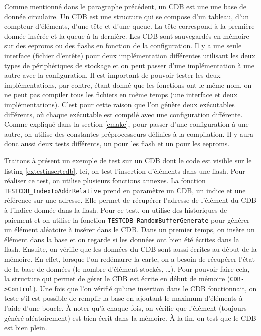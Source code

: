 \documentclass[a4paper]{article}
\begin{document}
Comme mentionné dans le paragraphe précédent, un CDB est une une base de donnée
circulaire. Un CDB est une structure qui se compose d'un tableau, d'un compteur
d'éléments, d'une tête et d'une queue. La tête correspond à la première donnée
insérée et la queue à la dernière. Les CDB sont sauvegardés en mémoire sur des
eeproms ou des flashs en fonction de la configuration. Il y a une seule
interface (fichier d'entête) pour deux implémentation différentes utilisant les
deux types de périphériques de stockage et on peut passer d'une implémentation à
une autre avec la configuration. Il est important de pouvoir tester les deux
implémentations, par contre, étant donné que les fonctions ont le même nom, on
ne peut pas compiler tous les fichiers en même temps (une interface et deux
implémentations). C'est pour cette raison que l'on génère deux exécutables
différents, où chaque exécutable est compilé avec une configuration différente.
Comme expliqué dans la section \ref{cmake}, pour passer d'une configuration à
une autre, on utilise des constantes préprocesseurs définies à la compilation.
Il y aura donc aussi deux tests différents, un pour les flash et un pour les
eeproms.

Traitons à présent un exemple de test sur un CDB dont le code est visible sur le
listing \ref{extestinsertcdb}. Ici, on test l'insertion d'éléments dans une
flash. Pour réaliser ce test, on utilise plusieurs fonctions annexes. La
fonction \verb|TESTCDB_IndexToAddrRelative| prend en paramètre un CDB, un indice
et une référence sur une adresse. Elle permet de récupérer l'adresse de
l'élément du CDB à l'indice donnée dans la flash. Pour ce test, on utilise des
historiques de paiement et on utilise la fonction
\verb|TESTCDB_RandomBufferGenerate| pour générer un élément aléatoire à insérer
dans le CDB. Dans un premier temps, on insère un élément dans la base et on
regarde si les données ont bien été écrites dans la flash. Ensuite, on vérifie
que les données du CDB sont aussi écrites au début de la mémoire. En effet,
lorsque l'on redémarre la carte, on a besoin de récupérer l'état de la base de
données (le nombre d'élément stockés, \dots). Pour pouvoir faire cela, la
structure qui permet de gérer le CDB est écrite en début de mémoire
(\verb|CDB->Control|). Une fois que l'on vérifié qu'une insertion dans le CDB
fonctionnait, on teste s'il est possible de remplir la base en ajoutant le
maximum d'éléments à l'aide d'une boucle. À noter qu'à chaque fois, on vérifie
que l'élément (toujours généré aléatoirement) est bien écrit dans la mémoire. À
la fin, on test que le CDB est bien plein.
\end{document}
